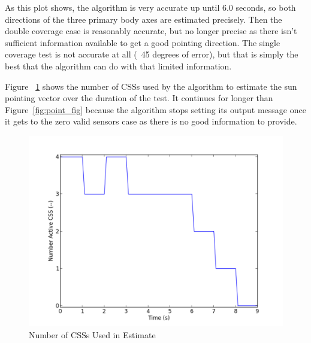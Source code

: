 \documentclass[]{BasiliskReportMemo}
\begin{document}
As this plot shows, the algorithm is very accurate up until 6.0 seconds, 
so both directions of the three primary body axes are estimated precisely.  
Then the double coverage case is reasonably accurate, but no longer precise as 
there isn't sufficient information available to get a good pointing direction.  
The single coverage test is not accurate at all (~45 degrees of error), but that 
is simply the best that the algorithm can do with that limited information.

Figure ~\ref{fig:num_fig} shows the number of CSSs used by the algorithm to 
estimate the sun pointing vector over the duration of the test.  It continues 
for longer than Figure~\ref{fig:point_fig} because the algorithm stops setting 
its output message once it gets to the zero valid sensors case as there is no 
good information to provide.
\begin{figure}[htb]
        \centerline{
        \includegraphics[scale=0.5]{Figures/numGoodCSS}
        }
        \caption{Number of CSSs Used in Estimate}
        \label{fig:num_fig}
\end{figure}
\end{document}
